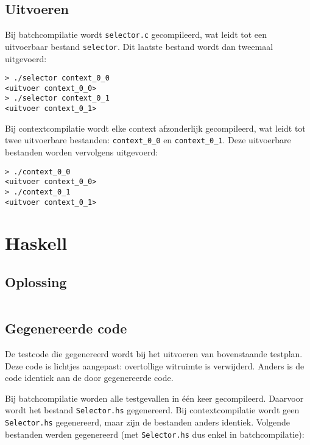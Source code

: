 \subsection{Uitvoeren}\label{subsec:echo-c-uitvoeren}

Bij batchcompilatie wordt \texttt{selector.c} gecompileerd, wat leidt tot een uitvoerbaar bestand \texttt{selector}.
Dit laatste bestand wordt dan tweemaal uitgevoerd:

\begin{verbatim}
> ./selector context_0_0
<uitvoer context_0_0>
> ./selector context_0_1
<uitvoer context_0_1>    
\end{verbatim}

Bij contextcompilatie wordt elke context afzonderlijk gecompileerd, wat leidt tot twee uitvoerbare bestanden: \texttt{context\_0\_0} en \texttt{context\_0\_1}.
Deze uitvoerbare bestanden worden vervolgens uitgevoerd:

\begin{verbatim}
> ./context_0_0
<uitvoer context_0_0>
> ./context_0_1
<uitvoer context_0_1>
\end{verbatim}


\section{Haskell}\label{sec:echo-haskell}

\subsection{Oplossing}\label{subsec:echo-haskell-oplossing}

\inputminted{haskell}{sources/echo/correct.hs}

\subsection{Gegenereerde code}\label{subsec:echo-haskell-gegenereerde-code}

De testcode die gegenereerd wordt bij het uitvoeren van bovenstaande testplan.
Deze code is lichtjes aangepast: overtollige witruimte is verwijderd.
Anders is de code identiek aan de door \tested{} gegenereerde code.

Bij batchcompilatie worden alle testgevallen in één keer gecompileerd.
Daarvoor wordt het bestand \texttt{Selector.hs} gegenereerd.
Bij contextcompilatie wordt geen \texttt{Selector.hs} gegenereerd, maar zijn de bestanden anders identiek.
Volgende bestanden werden gegenereerd (met \texttt{Selector.hs} dus enkel in batchcompilatie):

